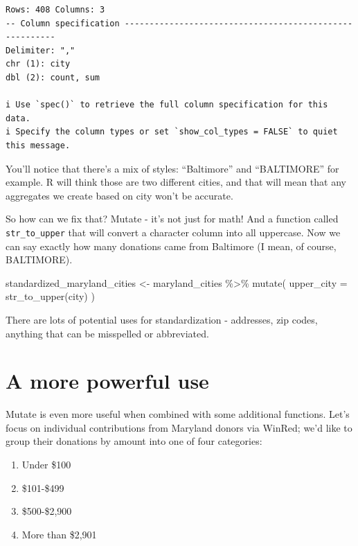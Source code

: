 \documentclass[
  letterpaper,
  DIV=11,
  numbers=noendperiod]{scrreprt}
\newenvironment{Shaded}{\begin{snugshade}}{\end{snugshade}}
\newcommand{\AttributeTok}[1]{\textcolor[rgb]{0.40,0.45,0.13}{#1}}
\newcommand{\FunctionTok}[1]{\textcolor[rgb]{0.28,0.35,0.67}{#1}}
\newcommand{\NormalTok}[1]{\textcolor[rgb]{0.00,0.23,0.31}{#1}}
\newcommand{\OtherTok}[1]{\textcolor[rgb]{0.00,0.23,0.31}{#1}}
\newcommand{\SpecialCharTok}[1]{\textcolor[rgb]{0.37,0.37,0.37}{#1}}
\providecommand{\tightlist}{%
  \setlength{\itemsep}{0pt}\setlength{\parskip}{0pt}}\usepackage{longtable,booktabs,array}
\begin{document}
\begin{verbatim}
Rows: 408 Columns: 3
-- Column specification --------------------------------------------------------
Delimiter: ","
chr (1): city
dbl (2): count, sum

i Use `spec()` to retrieve the full column specification for this data.
i Specify the column types or set `show_col_types = FALSE` to quiet this message.
\end{verbatim}

You'll notice that there's a mix of styles: ``Baltimore'' and
``BALTIMORE'' for example. R will think those are two different cities,
and that will mean that any aggregates we create based on city won't be
accurate.

So how can we fix that? Mutate - it's not just for math! And a function
called \texttt{str\_to\_upper} that will convert a character column into
all uppercase. Now we can say exactly how many donations came from
Baltimore (I mean, of course, BALTIMORE).

\begin{Shaded}
\begin{Highlighting}[]
\NormalTok{standardized\_maryland\_cities }\OtherTok{\textless{}{-}}\NormalTok{ maryland\_cities }\SpecialCharTok{\%\textgreater{}\%}
  \FunctionTok{mutate}\NormalTok{(}
    \AttributeTok{upper\_city =} \FunctionTok{str\_to\_upper}\NormalTok{(city)}
\NormalTok{)}
\end{Highlighting}
\end{Shaded}

There are lots of potential uses for standardization - addresses, zip
codes, anything that can be misspelled or abbreviated.

\hypertarget{a-more-powerful-use}{%
\section{A more powerful use}\label{a-more-powerful-use}}

Mutate is even more useful when combined with some additional functions.
Let's focus on individual contributions from Maryland donors via WinRed;
we'd like to group their donations by amount into one of four
categories:

\begin{enumerate}
\def\labelenumi{\arabic{enumi}.}
\tightlist
\item
  Under \$100
\item
  \$101-\$499
\item
  \$500-\$2,900
\item
  More than \$2,901
\end{enumerate}
\end{document}
